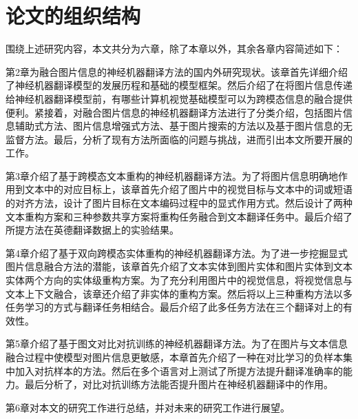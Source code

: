 \section{论文的组织结构}

围绕上述研究内容，本文共分为六章，除了本章以外，其余各章内容简述如下：

第2章为融合图片信息的神经机器翻译方法的国内外研究现状。该章首先详细介绍了神经机器翻译模型的发展历程和基础的模型框架。然后介绍了在将图片信息传递给神经机器翻译模型前，有哪些计算机视觉基础模型可以为跨模态信息的融合提供便利。紧接着，对融合图片信息的神经机器翻译方法进行了分类介绍，包括图片信息辅助式方法、图片信息增强式方法、基于图片搜索的方法以及基于图片信息的无监督方法。最后，分析了现有方法所面临的问题与挑战，进而引出本文所要开展的工作。

第3章介绍了基于跨模态文本重构的神经机器翻译方法。为了将图片信息明确地作用到文本中的对应目标上，该章首先介绍了图片中的视觉目标与文本中的词或短语的对齐方法，设计了图片目标在文本编码过程中的显式作用方式。然后设计了两种文本重构方案和三种参数共享方案将重构任务融合到文本翻译任务中。最后介绍了所提方法在英德翻译数据上的实验结果。

第4章介绍了基于双向跨模态实体重构的神经机器翻译方法。为了进一步挖掘显式图片信息融合方法的潜能，该章首先介绍了文本实体到图片实体和图片实体到文本实体两个方向的实体级重构方案。为了充分利用图片中的视觉信息，将视觉信息与文本上下文融合，该章还介绍了非实体的重构方案。然后将以上三种重构方法以多任务学习的方式与翻译任务相结合。最后介绍了此多任务方法在三个翻译对上的有效性。

第5章介绍了基于图文对比对抗训练的神经机器翻译方法。为了在图片与文本信息融合过程中使模型对图片信息更敏感，本章首先介绍了一种在对比学习的负样本集中加入对抗样本的方法。然后在多个语言对上测试了所提方法提升翻译准确率的能力。最后分析了，对比对抗训练方法能否提升图片在神经机器翻译中的作用。

第6章对本文的研究工作进行总结，并对未来的研究工作进行展望。